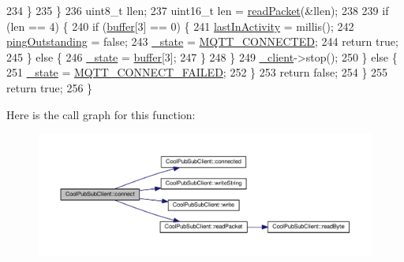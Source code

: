 \begin{DoxyCode}
234                 \}
235             \}
236             uint8\_t llen;
237             uint16\_t len = \hyperlink{class_cool_pub_sub_client_a25a8779149cfa809b7c06f63568b25cf}{readPacket}(&llen);
238 
239             \textcolor{keywordflow}{if} (len == 4) \{
240                 \textcolor{keywordflow}{if} (\hyperlink{class_cool_pub_sub_client_a7e8bcc6096626916046a51bebadc7851}{buffer}[3] == 0) \{
241                     \hyperlink{class_cool_pub_sub_client_abfc862f98f6a1a36232e28fd946d8902}{lastInActivity} = millis();
242                     \hyperlink{class_cool_pub_sub_client_a1742f1c17f1a1e2332613f925ad30cf9}{pingOutstanding} = \textcolor{keyword}{false};
243                     \hyperlink{class_cool_pub_sub_client_aa1953b601206252a30efa5b114eb3e1a}{\_state} = \hyperlink{_cool_pub_sub_client_8h_abb5539db14c26155eebe929fa84d1e96}{MQTT\_CONNECTED};
244                     \textcolor{keywordflow}{return} \textcolor{keyword}{true};
245                 \} \textcolor{keywordflow}{else} \{
246                     \hyperlink{class_cool_pub_sub_client_aa1953b601206252a30efa5b114eb3e1a}{\_state} = \hyperlink{class_cool_pub_sub_client_a7e8bcc6096626916046a51bebadc7851}{buffer}[3];
247                 \}
248             \}
249             \hyperlink{class_cool_pub_sub_client_a487a65bafb6e3b8e9ab544b13a8878a0}{\_client}->stop();
250         \} \textcolor{keywordflow}{else} \{
251             \hyperlink{class_cool_pub_sub_client_aa1953b601206252a30efa5b114eb3e1a}{\_state} = \hyperlink{_cool_pub_sub_client_8h_ac80cae63b769440c31b8c294ac5ea191}{MQTT\_CONNECT\_FAILED};
252         \}
253         \textcolor{keywordflow}{return} \textcolor{keyword}{false};
254     \}
255     \textcolor{keywordflow}{return} \textcolor{keyword}{true};
256 \}
\end{DoxyCode}
Here is the call graph for this function\+:\nopagebreak
\begin{figure}[H]
\begin{center}
\leavevmode
\includegraphics[width=350pt]{d8/d4b/class_cool_pub_sub_client_a7e5a85731dd25d90a41f6d859e61da77_cgraph}
\end{center}
\end{figure}
\mbox{\label{class_cool_pub_sub_client_a3d5a5da4ddb1e5c1bea64d80c665d148}} 
